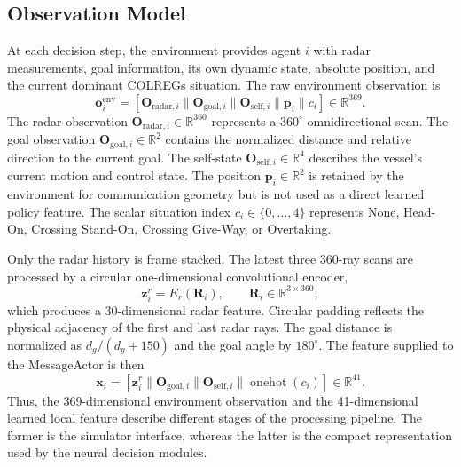 \documentclass[final,5p,times,twocolumn]{elsarticle}
\begin{document}
\subsection{Observation Model}
\label{sec:observation}
{\color{violet}
At each decision step, the environment provides agent $i$ with radar measurements, goal information, its own dynamic state, absolute position, and the current dominant COLREGs situation. The raw environment observation is
\begin{equation}
\mathbf{o}^{\mathrm{env}}_i=
[\mathbf{O}_{\mathrm{radar},i}\|\mathbf{O}_{\mathrm{goal},i}\|\mathbf{O}_{\mathrm{self},i}\|\mathbf{p}_i\|c_i]
\in\mathbb{R}^{369}.
\label{eq:env_obs}
\end{equation}
The radar observation $\mathbf{O}_{\mathrm{radar},i}\in\mathbb{R}^{360}$ represents a $360^\circ$ omnidirectional scan. The goal observation $\mathbf{O}_{\mathrm{goal},i}\in\mathbb{R}^{2}$ contains the normalized distance and relative direction to the current goal. The self-state $\mathbf{O}_{\mathrm{self},i}\in\mathbb{R}^{4}$ describes the vessel's current motion and control state. The position $\mathbf{p}_i\in\mathbb{R}^{2}$ is retained by the environment for communication geometry but is not used as a direct learned policy feature. The scalar situation index $c_i\in\{0,\ldots,4\}$ represents None, Head-On, Crossing Stand-On, Crossing Give-Way, or Overtaking.

Only the radar history is frame stacked. The latest three 360-ray scans are processed by a circular one-dimensional convolutional encoder,
\begin{equation}
\mathbf{z}^{r}_i=E_r(\mathbf{R}_i),
\qquad \mathbf{R}_i\in\mathbb{R}^{3\times360},
\label{eq:radar_encoder}
\end{equation}
which produces a 30-dimensional radar feature. Circular padding reflects the physical adjacency of the first and last radar rays. The goal distance is normalized as $d_g/(d_g+150)$ and the goal angle by $180^\circ$. The feature supplied to the MessageActor is then
\begin{equation}
\mathbf{x}_i=
[\mathbf{z}^{r}_i\|\mathbf{O}_{\mathrm{goal},i}\|\mathbf{O}_{\mathrm{self},i}\|\operatorname{onehot}(c_i)]
\in\mathbb{R}^{41}.
\label{eq:local_feature}
\end{equation}
Thus, the 369-dimensional environment observation and the 41-dimensional learned local feature describe different stages of the processing pipeline. The former is the simulator interface, whereas the latter is the compact representation used by the neural decision modules.
}
\end{document}
